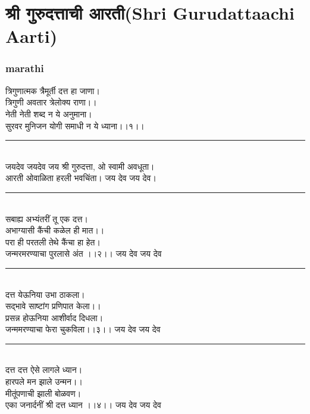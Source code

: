 \documentclass[letterpaper,twocolumn,openany,nodeprecatedcode]{dndbook}
\begin{document}
\chapter{श्री गुरुदत्ताची आरती(Shri Gurudattaachi Aarti)}
\begin{flushleft}
  \subsection*{marathi}
  त्रिगुणात्मक त्रैमूर्ती दत्त हा जाणा।  \\
  त्रिगुणी अवतार त्रेलोक्य राणा।। \\
  नेती नेती शब्द न ये अनुमाना।  \\
  सुरवर मुनिजन योगी समाधी न ये ध्याना।।१।। \\
  \rule{\linewidth}{1pt} \\
  जयदेव जयदेव जय श्री गुरुदत्ता, ओ स्वामी अवधूता।\\ आरती ओवाळिता हरली भवचिंता। जय देव जय देव।
  \rule{\linewidth}{1pt} \\
  सबाह्य अभ्यंतरीं तू एक दत्त।\\ अभाग्यासी कैंची कळेल ही मात।।\\
  परा ही परतली तेथे कैंचा हा हेत।\\ जन्मरमरण्याचा पुरलासे अंत ।।२।। जय देव जय देव
  \rule{\linewidth}{1pt} \\
  दत्त येऊनिया उभा ठाकला।\\ सद्भावे साष्टांग प्रणिपात केला।।\\
  प्रसन्न होऊनिया आशीर्वाद दिधला।\\ जन्ममरण्याचा फेरा चुकविला।।३।। जय देव जय देव
  \rule{\linewidth}{1pt} \\
  दत्त दत्त ऐसे लागले ध्यान।\\ हारपले मन झाले उन्मन।। \\
  मीतूंपणाची झाली बोळवण।\\ एका जनार्दनीं श्री दत्त ध्यान ।।४।। जय देव जय देव
  \pagebreak

\end{flushleft}
\end{document}
